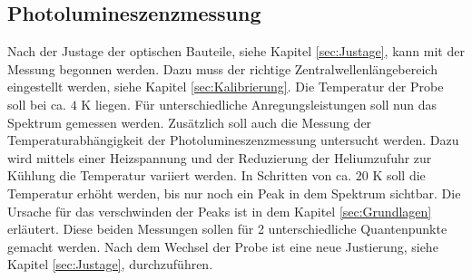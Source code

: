 \subsection{Photolumineszenzmessung}
Nach der Justage der optischen Bauteile, siehe Kapitel \ref{sec:Justage}, kann mit der Messung begonnen werden.
Dazu muss der richtige Zentralwellenlängebereich eingestellt werden, siehe Kapitel \ref{sec:Kalibrierung}. 
Die Temperatur der Probe soll bei ca. $4$ K liegen. Für unterschiedliche Anregungsleistungen soll nun das Spektrum gemessen werden.  
Zusätzlich soll auch die Messung der Temperaturabhängigkeit der Photolumineszenzmessung untersucht werden. 
Dazu wird mittels einer Heizspannung und der Reduzierung der Heliumzufuhr zur Kühlung die Temperatur variiert werden.
In Schritten von ca. $20$ K soll die Temperatur erhöht werden, bis nur noch ein Peak in dem Spektrum sichtbar. Die Ursache für das verschwinden der Peaks ist in dem Kapitel \ref{sec:Grundlagen} erläutert. 
Diese beiden Messungen sollen für 2 unterschiedliche Quantenpunkte gemacht werden. 
Nach dem Wechsel der Probe ist eine neue Justierung, siehe Kapitel \ref{sec:Justage}, durchzuführen.  


